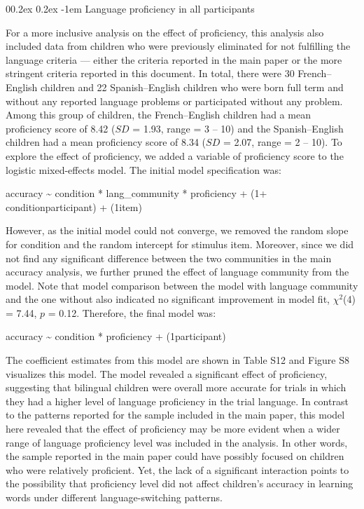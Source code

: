 \documentclass[
  man,floatsintext]{apa7}
\makeatletter
\let\oldparagraph\paragraph
\renewcommand{\paragraph}[1]{\oldparagraph{#1}\mbox{}}
\renewcommand{\paragraph}{\@startsection{paragraph}{4}{\parindent}%
  {0\baselineskip \@plus 0.2ex \@minus 0.2ex}%
  {-1em}%
  {\normalfont\normalsize\bfseries\itshape\typesectitle}}
\renewcommand{\paragraph}{\@startsection{paragraph}{4}{\parindent}%
  {0\baselineskip \@plus 0.2ex \@minus 0.2ex}%
  {-1em}%
  {\normalfont\normalsize\bfseries\typesectitle}}
\makeatother
\begin{document}
\hypertarget{language-proficiency-in-all-participants}{%
\paragraph{Language proficiency in all participants}\label{language-proficiency-in-all-participants}}

For a more inclusive analysis on the effect of proficiency, this analysis also included data from children who were previously eliminated for not fulfilling the language criteria --- either the criteria reported in the main paper or the more stringent criteria reported in this document. In total, there were 30 French--English children and 22 Spanish--English children who were born full term and without any reported language problems or participated without any problem. Among this group of children, the French--English children had a mean proficiency score of 8.42 (\(SD\) = 1.93, range = 3 -- 10) and the Spanish--English children had a mean proficiency score of 8.34 (\(SD\) = 2.07, range = 2 -- 10). To explore the effect of proficiency, we added a variable of proficiency score to the logistic mixed-effects model. The initial model specification was:

accuracy \textasciitilde{} condition * lang\_community * proficiency + (1+ condition\textbar participant) + (1\textbar item)

However, as the initial model could not converge, we removed the random slope for condition and the random intercept for stimulus item. Moreover, since we did not find any significant difference between the two communities in the main accuracy analysis, we further pruned the effect of language community from the model. Note that model comparison between the model with language community and the one without also indicated no significant improvement in model fit, \(\chi^2\)(4) = 7.44, \(p\) = 0.12. Therefore, the final model was:

accuracy \textasciitilde{} condition * proficiency + (1\textbar participant)

The coefficient estimates from this model are shown in Table S12 and Figure S8 visualizes this model. The model revealed a significant effect of proficiency, suggesting that bilingual children were overall more accurate for trials in which they had a higher level of language proficiency in the trial language. In contrast to the patterns reported for the sample included in the main paper, this model here revealed that the effect of proficiency may be more evident when a wider range of language proficiency level was included in the analysis. In other words, the sample reported in the main paper could have possibly focused on children who were relatively proficient. Yet, the lack of a significant interaction points to the possibility that proficiency level did not affect children's accuracy in learning words under different language-switching patterns.
\end{document}
